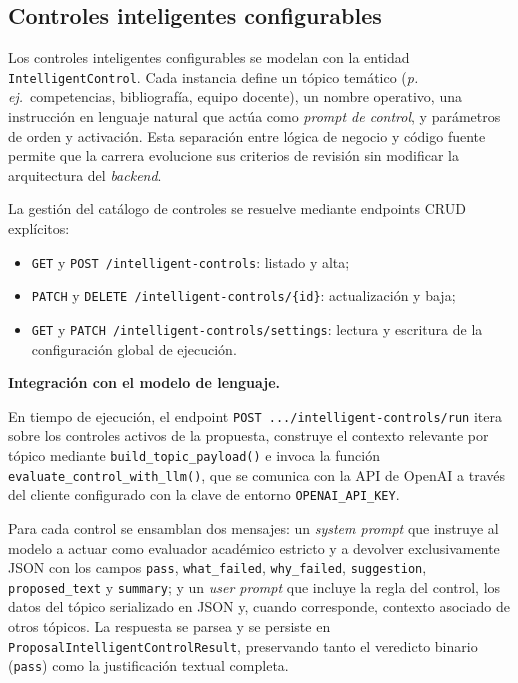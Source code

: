 \subsection{Controles inteligentes configurables}
\label{subsec:controles_inteligentes}

Los controles inteligentes configurables se modelan con la entidad
\texttt{IntelligentControl}. Cada instancia define un tópico temático
(\textit{p.\,ej.}\ competencias, bibliografía, equipo docente), un nombre
operativo, una instrucción en lenguaje natural que actúa como
\textit{prompt de control}, y parámetros de orden y activación.
Esta separación entre lógica de negocio y código fuente permite que
la carrera evolucione sus criterios de revisión sin modificar la
arquitectura del \textit{backend}.

La gestión del catálogo de controles se resuelve mediante endpoints CRUD
explícitos:
\begin{itemize}[noitemsep, topsep=2pt]
    \item \texttt{GET} y \texttt{POST /intelligent-controls}: listado y alta;
    \item \texttt{PATCH} y \texttt{DELETE /intelligent-controls/\{id\}}:
      actualización y baja;
    \item \texttt{GET} y \texttt{PATCH /intelligent-controls/settings}:
      lectura y escritura de la configuración global de ejecución.
\end{itemize}

\medskip
\noindent\textbf{Integración con el modelo de lenguaje.}

En tiempo de ejecución, el endpoint
\texttt{POST .../intelligent-controls/run} itera sobre los controles activos
de la propuesta, construye el contexto relevante por tópico mediante
\texttt{build\_topic\_payload()} e invoca la función
\texttt{evaluate\_control\_\allowbreak with\_llm()}, que se comunica con la
API de OpenAI a través del cliente configurado con la clave de entorno
\texttt{OPENAI\_API\_KEY}.

Para cada control se ensamblan dos mensajes:
un \textit{system prompt} que instruye al modelo a actuar como evaluador
académico estricto y a devolver exclusivamente JSON con los campos
\texttt{pass}, \texttt{what\_failed}, \texttt{why\_failed},
\texttt{suggestion}, \texttt{proposed\_text} y \texttt{summary};
y un \textit{user prompt} que incluye la regla del control, los datos
del tópico serializado en JSON y, cuando corresponde, contexto asociado
de otros tópicos.
La respuesta se parsea y se persiste en
\texttt{ProposalIntelligentControlResult}, preservando tanto el veredicto
binario (\texttt{pass}) como la justificación textual completa.

